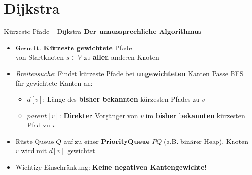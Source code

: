 



\morescalingdelimiters


	


\section{Dijkstra}
	
\begin{frame}{Kürzeste Pfade – Dijkstra}
	\textbf{Der unaussprechliche Algorithmus} 
	\begin{itemize}
		\item Gesucht: \textbf{Kürzeste gewichtete} Pfade \\
		von Startknoten $s \in V$ zu \textbf{allen} anderen Knoten
		\pause
		\item \textit{Breitensuche}: Findet kürzeste Pfade bei \textbf{ungewichteten} Kanten
		\pause
		\implitem Passe BFS für gewichtete Kanten an: 
		\begin{itemize}
			\item $d[v]$: Länge des \textbf{bisher bekannten} kürzesten Pfades zu $v$ 
			\vspace{.2\baselineskip}
			\item $parent[v]$: \textbf{Direkter} Vorgänger von $v$ im \textbf{bisher bekannten} kürzesten Pfad zu $v$
		\end{itemize}
		\pause
		\item Rüste Queue $Q$ auf zu einer \textbf{PriorityQueue} $PQ$ (z.B. binärer Heap), Knoten $v$ wird mit $d[v]$ gewichtet
		\pause
		\item \alert{Wichtige Einschränkung: \textbf{Keine negativen Kantengewichte!}}
	\end{itemize}
\end{frame}

